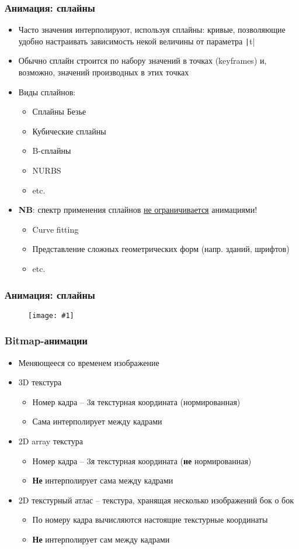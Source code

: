 \documentclass[10pt]{beamer}
\newcommand{\slideimage}[1]{
  \begin{figure}
    \begin{adjustbox}{width=\textwidth, totalheight=\textheight-2\baselineskip-2\baselineskip,keepaspectratio}
      \texttt{[image: \#1]}
    \end{adjustbox}
  \end{figure}
}
\begin{document}
\begin{frame}[fragile]
\frametitle{Анимация: сплайны}
\begin{itemize}
\item Часто значения интерполируют, используя сплайны: кривые, позволяющие удобно настраивать зависимость некой величины от параметра \texttt|t|
\pause
\item Обычно сплайн строится по набору значений в точках (keyframes) и, возможно, значений производных в этих точках
\pause
\item Виды сплайнов:
\begin{itemize}
\item Сплайны Безье
\item Кубические сплайны
\item B-сплайны
\item NURBS
\item etc.
\end{itemize}
\pause
\item \alert{\textbf{NB}}: спектр применения сплайнов \underline{не ограничивается} анимациями!
\begin{itemize}
\item Curve fitting
\item Представление сложных геометрических форм (напр. зданий, шрифтов)
\item etc.
\end{itemize}
\end{itemize}
\end{frame}

\begin{frame}[fragile]
\frametitle{Анимация: сплайны}
\slideimage{spline-editing.png}
\end{frame}

\begin{frame}[fragile]
\frametitle{Bitmap-анимации}
\begin{itemize}
\item Меняющееся со временем изображение
\pause
\item 3D текстура
\begin{itemize}
\item Номер кадра -- 3я текстурная координата (нормированная)
\item Сама интерполирует между кадрами
\end{itemize}
\pause
\item 2D array текстура
\begin{itemize}
\item Номер кадра -- 3я текстурная координата (\textbf{не} нормированная)
\item \textbf{Не} интерполирует сама между кадрами
\end{itemize}
\pause
\item 2D текстурный атлас -- текстура, хранящая несколько изображений бок о бок
\begin{itemize}
\item По номеру кадра вычисляются настоящие текстурные координаты
\item \textbf{Не} интерполирует сам между кадрами
\end{itemize}
\end{itemize}
\end{frame}
\end{document}
